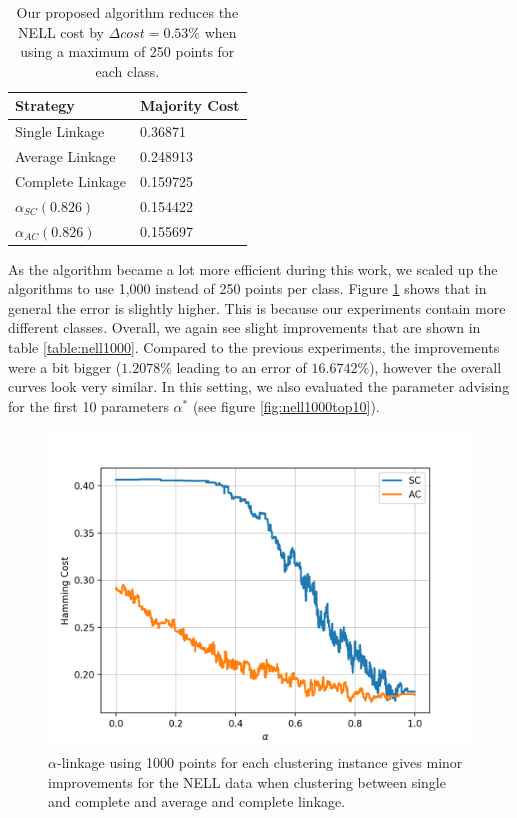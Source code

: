 \begin{table}[h]
    \centering
    \begin{tabular}{|l | l|}
    \hline
    Strategy & Majority Cost\\ \hline
    Single Linkage & 0.36871\\
    Average Linkage & 0.248913\\
    Complete Linkage & 0.159725\\
    $\alpha_{SC}(0.826)$ & 0.154422\\
    $\alpha_{AC}(0.826)$ & 0.155697\\\hline
    \end{tabular}
    \caption{Our proposed algorithm reduces the NELL cost by $\Delta cost = 0.53\%$ when using a maximum of 250 points for each class.}
    \label{table:nellresults}
\end{table}

As the algorithm became a lot more efficient during this work, we scaled up the algorithms to use 1,000 instead of 250 points per class. Figure \ref{fig:nellresults1000} shows that in general the error is slightly higher. This is because our experiments contain more different classes. Overall, we again see slight improvements that are shown in table \ref{table:nell1000}. Compared to the previous experiments, the improvements were a bit bigger ($1.2078\%$ leading to an error of $16.6742\%$), however the overall curves look very similar. In this setting, we also evaluated the parameter advising for the first 10 parameters $\alpha^*$ (see figure \ref{fig:nell1000top10}).

\begin{figure}[h]
\centering
  \includegraphics[width=.5\linewidth]{plots/nell_1000}
\caption{$\alpha$-linkage using 1000 points for each clustering instance gives minor improvements for the NELL data when clustering between single and complete and average and complete linkage.}
\label{fig:nellresults1000}
\end{figure}

